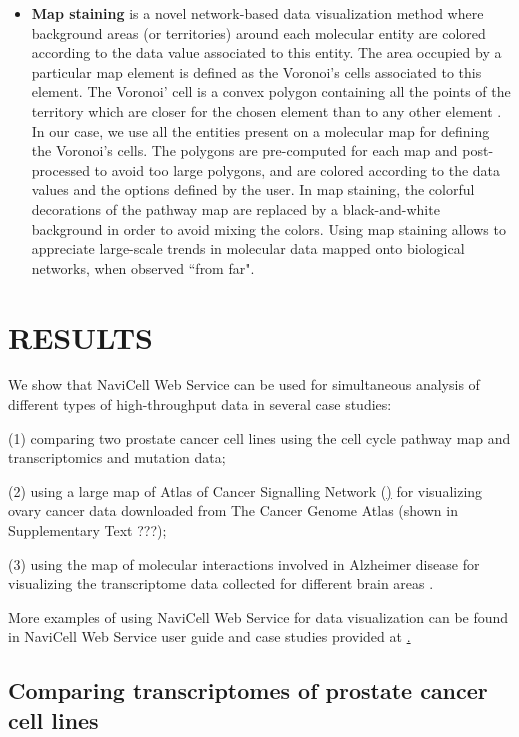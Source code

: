 \documentclass[a4,center,fleqn]{NAR}
\begin{document}
\begin{itemize}
\item \textbf{Map staining} is a novel network-based data visualization method where
background areas (or territories) around each molecular entity are colored according to the data
value associated to this entity. The area occupied by a particular map element is defined as the Voronoi's cells
associated to this element. The Voronoi' cell is a convex polygon containing all the points
of the territory which are closer for the chosen element than to any other element
\cite{aurenhammer1991voronoi}. In our case, we use all the entities present on a molecular map
for defining the Voronoi's cells. The polygons are pre-computed for each map and post-processed
to avoid too large polygons, and are colored according to the data values and the options
defined by the user. In map staining, the colorful decorations of the pathway map
are replaced by a black-and-white background in order to avoid mixing the colors.
Using map staining allows to appreciate large-scale trends in molecular data mapped
onto biological networks, when observed ``from far".

\end{itemize}



\section{RESULTS}

We show that NaviCell Web Service can be used for simultaneous analysis of different types of high-throughput data
in several case studies:

(1) comparing two prostate cancer cell lines using the cell cycle pathway map and transcriptomics and mutation data;

(2) using a large map of Atlas of Cancer Signalling Network (\href{http://acsn.curie.fr}) \cite{Kuperstein2015} for visualizing ovary cancer data downloaded from The Cancer Genome Atlas \cite{TCGA2011Ovarian} (shown in Supplementary Text ???);

(3) using the map of molecular interactions involved in Alzheimer disease \cite{Mizuno2012} for visualizing the transcriptome data collected for different brain areas \cite{Hokama2014}.

More examples of using NaviCell Web Service for data visualization can be found in NaviCell Web Service user guide and case studies
provided at \href{http://navicell.curie.fr/pages/nav\_web\_service.html}.


\subsection{Comparing transcriptomes of prostate cancer cell lines}
\end{document}
